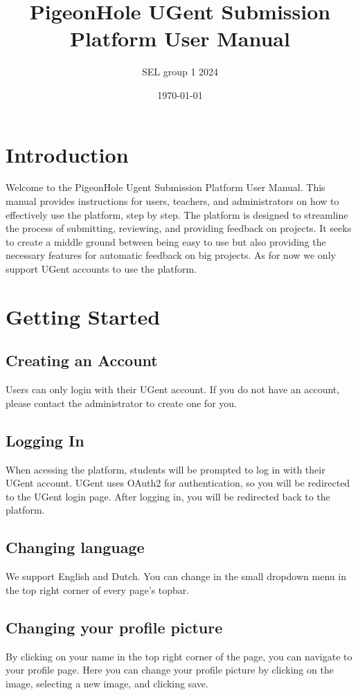 \documentclass{article}
\title{PigeonHole UGent Submission Platform User Manual}
\author{SEL group 1 2024}
\date{\today}
\begin{document}
\maketitle

\tableofcontents

\section{Introduction}
Welcome to the PigeonHole Ugent Submission Platform User Manual. This manual provides instructions for users, teachers, and administrators on how to effectively use the platform, step by step. The platform is designed to streamline the process of submitting, reviewing, and providing feedback on projects. It seeks to create a middle ground between being easy to use but also providing the necessary features for automatic feedback on big projects. As for now we only support UGent accounts to use the platform.

\section{Getting Started}
\subsection{Creating an Account}
Users can only login with their UGent account. If you do not have an account, please contact the administrator to create one for you.

\subsection{Logging In}
When acessing the platform, students will be prompted to log in with their UGent account. UGent uses OAuth2 for authentication, so you will be redirected to the UGent login page. After logging in, you will be redirected back to the platform.

\subsection{Changing language}
We support English and Dutch. You can change in the small dropdown menu in the top right corner of every page's topbar.

\subsection{Changing your profile picture}
By clicking on your name in the top right corner of the page, you can navigate to your profile page. Here you can change your profile picture by clicking on the image, selecting a new image, and clicking save.
\end{document}
